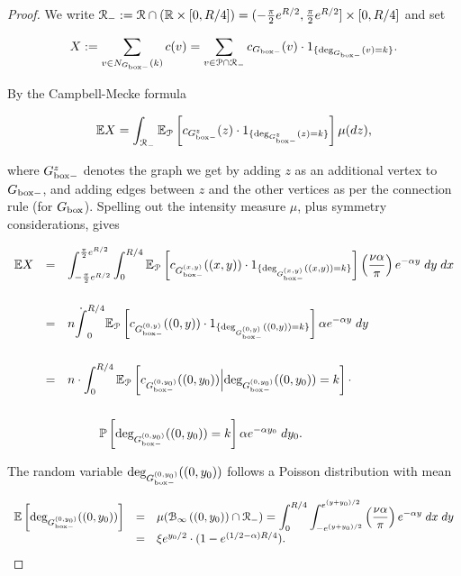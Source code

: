  \begin{proof}
 We write ${\mathcal R}_- := {\mathcal R} \cap ({\mathbb R}\times[0,R/4]) = (-\frac{\pi}{2}e^{R/2}, \frac{\pi}{2} e^{R/2}] \times [0,R/4]$ and set 
 
 $$ 
 X := \sum_{v \in N_{G_{\mathrm{box}-}}(k)} c(v) = \sum_{v \in {\mathcal P} \cap {\mathcal R}_-} c_{G_{\mathrm{box}-}}(v) \cdot 1_{\{\text{deg}_{G_{\mathrm{box}-}}(v)=k\}}.
 $$
 
 \noindent
 By the Campbell-Mecke formula
 
 $$ {\mathbb E} X = \int_{{\mathcal R}_-} 
 {\mathbb E}_{{\mathcal P}}\left[ c_{G_{\mathrm{box}-}^z}(z) \cdot 1_{\{\text{deg}_{G_{\mathrm{box}-}^z}(z)=k\}}\right] \mu(dz), $$
 
 \noindent
 where $G_{\mathrm{box}-}^z$ denotes the graph we get by adding $z$ as an additional vertex to $G_{\mathrm{box}-}$, and adding edges between $z$ and the other 
 vertices as per the connection rule (for $G_{\mathrm{box}}$).
 Spelling out the intensity measure $\mu$, plus symmetry considerations, gives
 
 $$ \begin{array}{rcl}
     {\mathbb E} X 
     & = & \displaystyle 
     \int_{-\frac{\pi}{2}e^{R/2}}^{\frac{\pi}{2}e^{R/2}} \int_0^{R/4}
     {\mathbb E}_{{\mathcal P}}\left[ c_{G_{\mathrm{box}-}^{(x,y)}}((x,y)) \cdot 1_{\{\text{deg}_{G_{\mathrm{box}-}^{(x,y)}}((x,y))=k\}}\right] 
     \left(\frac{\nu\alpha}{\pi}\right) e^{-\alpha y}\;dy\;dx \\[6ex]
     & = & \displaystyle
     n \dot \int_0^{R/4}
     {\mathbb E}_{{\mathcal P}}\left[ c_{G_{\mathrm{box}-}^{(0,y)}}((0,y)) \cdot 1_{\{\text{deg}_{G_{\mathrm{box}-}^{(0,y)}}((0,y))=k\}}\right] 
     \alpha e^{-\alpha y}\;d y \\[6ex]
     & = & \displaystyle
     n \cdot \int_0^{R/4} {\mathbb E}_{{\mathcal P}}\left[ c_{G_{\mathrm{box}-}^{(0,y_0)}}((0,y_0)) {\Big|} \text{deg}_{G_{\mathrm{box}-}^{(0,y_0)}}((0,y_0))=k \right] \cdot \\[6ex]
     & & \displaystyle \hspace{6ex} 
     \mathbb{P}\left[ \text{deg}_{G_{\mathrm{box}-}^{(0,y_0)}}((0,y_0))=k  \right] \alpha e^{-\alpha y_0} \;dy_0.
    \end{array}
$$

\noindent
The random variable $\text{deg}_{G_{\mathrm{box}-}^{(0,y_0)}}((0,y_0))$ follows a Poisson distribution with mean 

$$ \begin{array}{rcl} 
{\mathbb E}\left[ \text{deg}_{G_{\mathrm{box}-}^{(0,y_0)}}((0,y_0))\right] 
& = & \displaystyle  
\mu({\mathcal B}_{\infty}\left((0,y_0)\right)\cap{\mathcal R}_-) 
= \int_0^{R/4} \int_{-e^{(y+y_0)/2}}^{e^{(y+y_0)/2}} \left(\frac{\nu\alpha}{\pi}\right) e^{-\alpha y}\;dx\;dy \\
& = & \xi e^{y_0/2} \cdot (1-e^{(1/2-\alpha)R/4}). 
\end{array} $$


\end{proof}
